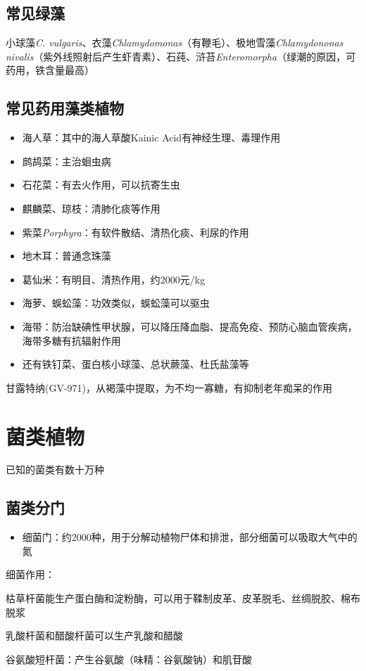 \subsection{常见绿藻}%
\label{sub:常见绿藻}
小球藻\textit{C. vulgaris}、衣藻\textit{Chlamydomonas}（有鞭毛）、极地雪藻\textit{Chlamydononas nivalis}（紫外线照射后产生虾青素）、石莼、浒苔\textit{Enteromorpha}（绿潮的原因，可药用，铁含量最高）
\subsection{常见药用藻类植物}%
\label{sub:常见药用藻类植物}
\begin{itemize}
    \item 海人草：其中的海人草酸Kainic Acid有神经生理、毒理作用
    \item 鹧鸪菜：主治蛔虫病
    \item 石花菜：有去火作用，可以抗寄生虫
    \item 麒麟菜、琼枝：清肺化痰等作用
    \item 紫菜\textit{Porphyra}：有软件散结、清热化痰、利尿的作用
    \item 地木耳：普通念珠藻
    \item 葛仙米：有明目、清热作用，约2000元/kg
    \item 海萝、蜈蚣藻：功效类似，蜈蚣藻可以驱虫
    \item 海带：防治缺碘性甲状腺，可以降压降血脂、提高免疫、预防心脑血管疾病，海带多糖有抗辐射作用
    \item 还有铁钉菜、蛋白核小球藻、总状蕨藻、杜氏盐藻等
\end{itemize}
\begin{notation}
    甘露特纳(GV-971)，从褐藻中提取，为不均一寡糖，有抑制老年痴呆的作用
\end{notation}
\section{菌类植物}%
\label{sec:菌类植物}
\begin{notation}
    已知的菌类有数十万种
\end{notation}
\subsection{菌类分门}%
\label{sub:菌类分门}
\begin{itemize}
    \item 细菌门：约2000种，用于分解动植物尸体和排泄，部分细菌可以吸取大气中的氮
    
\end{itemize}
\begin{notation}
    细菌作用：

    枯草杆菌能生产蛋白酶和淀粉酶，可以用于鞣制皮革、皮革脱毛、丝绸脱胶、棉布脱浆

    乳酸杆菌和醋酸杆菌可以生产乳酸和醋酸

    谷氨酸短杆菌：产生谷氨酸（味精：谷氨酸钠）和肌苷酸
\end{notation}
